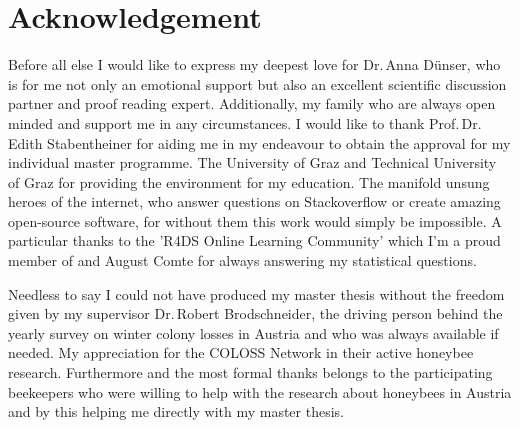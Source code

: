 \chapter*{Acknowledgement}
\label{sec:acknowledgement}
\vspace*{-10mm}

Before all else I would like to express my deepest love for Dr.\,Anna Dünser, who is for me not only an emotional support but also an excellent scientific discussion partner and proof reading expert. Additionally, my family who are always open minded and support me in any circumstances. I would like to thank Prof.\,Dr.\,Edith Stabentheiner for aiding me in my endeavour to obtain the approval for my individual master programme. The University of Graz and Technical University of Graz for providing the environment for my education. The manifold unsung heroes of the internet, who answer questions on Stackoverflow or create amazing open-source software, for without them this work would simply be impossible. A particular thanks to the 'R4DS Online Learning Community' which I'm a proud member of and August Comte for always answering my statistical questions.

Needless to say I could not have produced my master thesis without the freedom given by my supervisor Dr.\,Robert Brodschneider, the driving person behind the yearly survey on winter colony losses in Austria and who was always available if needed. My appreciation for the COLOSS Network in their active honeybee research. Furthermore and the most formal thanks belongs to the participating beekeepers who were willing to help with the research about honeybees in Austria and by this helping me directly with my master thesis.